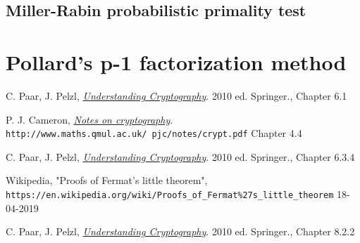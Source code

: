 \documentclass{article}
\begin{document}
	\subsection*{Miller-Rabin probabilistic primality test}
	
	\section*{Pollard's p-1 factorization method}
	 

	\newpage

	\begin{thebibliography}{99}
		
		C. Paar, J. Pelzl, 
		\textit{\underline{Understanding Cryptography}}. 2010 ed.
		Springer., Chapter 6.1 
		
		P. J. Cameron, 
		\textit{\underline{Notes on cryptography}}.
		\\\texttt{http://www.maths.qmul.ac.uk/~pjc/notes/crypt.pdf}
		Chapter 4.4 
		
		C. Paar, J. Pelzl, 
		\textit{\underline{Understanding Cryptography}}. 2010 ed.
		Springer., Chapter 6.3.4 
		
		Wikipedia, "Proofs of Fermat's little theorem",
		\\\texttt{https://en.wikipedia.org/wiki/Proofs\_of\_Fermat\%27s\_little\_theorem} 18-04-2019
		
		C. Paar, J. Pelzl, 
		\textit{\underline{Understanding Cryptography}}. 2010 ed.
		Springer., Chapter 8.2.2 
		
	\end{thebibliography}
\end{document}
